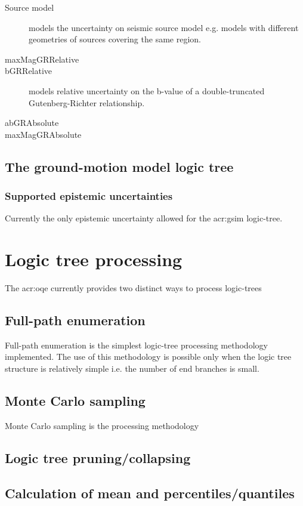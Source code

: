 \begin{description}
\item [Source model] models the uncertainty on seismic source model e.g. models
with different geometries of sources covering the same region.
\item [maxMagGRRelative]
\item [bGRRelative] models relative uncertainty on the b-value of a
double-truncated Gutenberg-Richter relationship.
\item [abGRAbsolute]
\item [maxMagGRAbsolute]
\end{description}
%
\subsection{The ground-motion model logic tree}
%
\subsubsection{Supported epistemic uncertainties}
Currently the only epistemic uncertainty allowed for the \gls{acr:gsim}
logic-tree.
%
\section{Logic tree processing}
The \gls{acr:oqe} currently provides two distinct ways to process logic-trees
%
\subsection{Full-path enumeration}
Full-path enumeration is the simplest logic-tree processing methodology
implemented. The use of this methodology is possible only when the logic tree
structure is relatively simple i.e. the number of end branches is small. 
%
\subsection{Monte Carlo sampling}
Monte Carlo sampling is the processing methodology 
%
\subsection{Logic tree pruning/collapsing}
\subsection{Calculation of mean and percentiles/quantiles}
